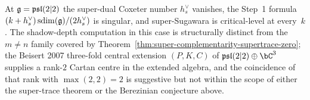 \begin{remark}
\label{rem:psl-2-2-shadow-depth}
At $\mathfrak{g}=\mathfrak{psl}(2|2)$ the super-dual Coxeter number $h^{\vee}_{s}$
vanishes, the Step~1 formula
$(k+h^{\vee}_{s})\operatorname{sdim}(\mathfrak{g})/(2 h^{\vee}_{s})$ is singular, and
super-Sugawara is critical-level at every~$k$. The shadow-depth
computation in this case is structurally distinct from the
$m\neq n$ family covered by
Theorem~\ref{thm:super-complementarity-supertrace-zero}; the Beisert
2007 three-fold central extension $(P,K,C)$ of
$\fpsl(2|2)\oplus\bC^{3}$ supplies a rank-$2$ Cartan centre in the
extended algebra, and the coincidence of that rank with $\max(2,2)=2$
is suggestive but not within the scope of either the super-trace
theorem or the Berezinian conjecture above.
\end{remark}

